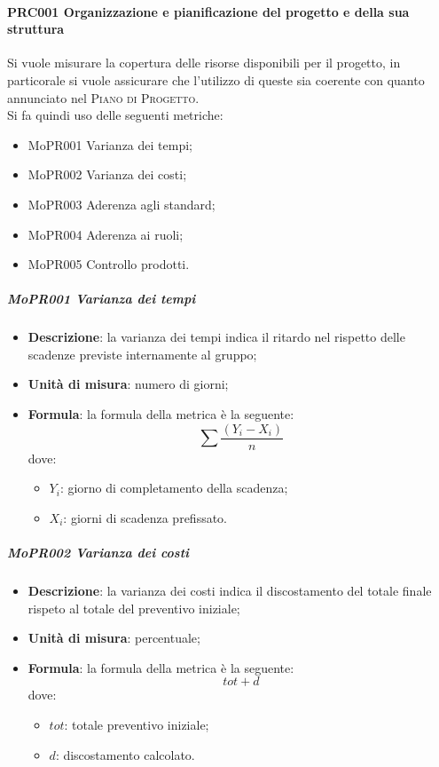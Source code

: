 \documentclass[../norme-di-progetto.tex]{subfiles}
\begin{document}
\paragraph{PRC001 Organizzazione e pianificazione del progetto e della sua struttura}
Si vuole misurare la copertura delle risorse disponibili per il progetto, in particorale si vuole assicurare che l'utilizzo di queste sia coerente con quanto annunciato nel \textsc{Piano di Progetto}. \\
Si fa quindi uso delle seguenti metriche:
\begin{itemize}
  \item MoPR001 Varianza dei tempi;
  \item MoPR002 Varianza dei costi;
  \item MoPR003 Aderenza agli standard;
  \item MoPR004 Aderenza ai ruoli;
  \item MoPR005 Controllo prodotti.
\end{itemize}
\subparagraph{MoPR001 Varianza dei tempi}
\begin{itemize}
  \item \textbf{Descrizione}: la varianza dei tempi indica il ritardo nel rispetto delle scadenze previste internamente al gruppo;
  \item \textbf{Unità di misura}: numero di giorni;
  \item \textbf{Formula}: la formula della metrica è la seguente:
    \begin{displaymath}
    \sum \frac{(Y_i - X_i)}{n}
    \end{displaymath}
    dove:
    \begin{itemize}
      \item $ Y_i $: giorno di completamento della scadenza;
      \item $ X_i $: giorni di scadenza prefissato.
    \end{itemize}
\end{itemize}
\subparagraph{MoPR002 Varianza dei costi}
\begin{itemize}
  \item \textbf{Descrizione}: la varianza dei costi indica il discostamento del totale finale rispeto al totale del preventivo iniziale;
  \item \textbf{Unità di misura}: percentuale;
  \item \textbf{Formula}: la formula della metrica è la seguente:
  \begin{displaymath}
    tot + d
  \end{displaymath}
  dove:
  \begin{itemize}
    \item $ tot $: totale preventivo iniziale;
    \item $ d $: discostamento calcolato.
  \end{itemize}
\end{itemize}
\end{document}
